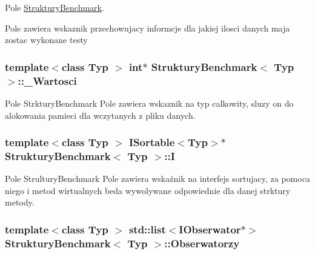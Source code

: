 Pole \hyperlink{class_struktury_benchmark}{Struktury\-Benchmark}. 

Pole zawiera wskaznik przechowujacy informcje dla jakiej ilosci danych maja zostac wykonane testy \hypertarget{class_struktury_benchmark_a98c2030555bbaa7fc7efe720bf22696c}{
\subsubsection[{\-\_\-\-Wartosci}]{\setlength{\rightskip}{0pt plus 5cm}template$<$class Typ $>$ int$\ast$ {\bf Struktury\-Benchmark}$<$ Typ $>$\-::\-\_\-\-Wartosci\hspace{0.3cm}{\ttfamily [private]}}}\label{class_struktury_benchmark_a98c2030555bbaa7fc7efe720bf22696c}


Pole Strktury\-Benchmark Pole zawiera wskaznik na typ calkowity, sluzy on do alokowania pamieci dla wczytanych z pliku danych. 

\hypertarget{class_struktury_benchmark_ab10e00df9ce397566d73f1a3697193f2}{
\subsubsection[{I}]{\setlength{\rightskip}{0pt plus 5cm}template$<$class Typ $>$ {\bf I\-Sortable}$<$Typ$>$$\ast$ {\bf Struktury\-Benchmark}$<$ Typ $>$\-::I\hspace{0.3cm}{\ttfamily [private]}}}\label{class_struktury_benchmark_ab10e00df9ce397566d73f1a3697193f2}


Pole Strultury\-Benchmark Pole zawiera wskaźnik na interfejs sortujacy, za pomoca niego i metod wirtualnych beda wywolywane odpowiednie dla danej strktury metody. 

\hypertarget{class_struktury_benchmark_a5c96eb86dfccdad59d41d478ca8d66c3}{
\subsubsection[{Obserwatorzy}]{\setlength{\rightskip}{0pt plus 5cm}template$<$class Typ $>$ std\-::list$<${\bf I\-Obserwator}$\ast$$>$ {\bf Struktury\-Benchmark}$<$ Typ $>$\-::Obserwatorzy\hspace{0.3cm}{\ttfamily [private]}}}\label{class_struktury_benchmark_a5c96eb86dfccdad59d41d478ca8d66c3}


